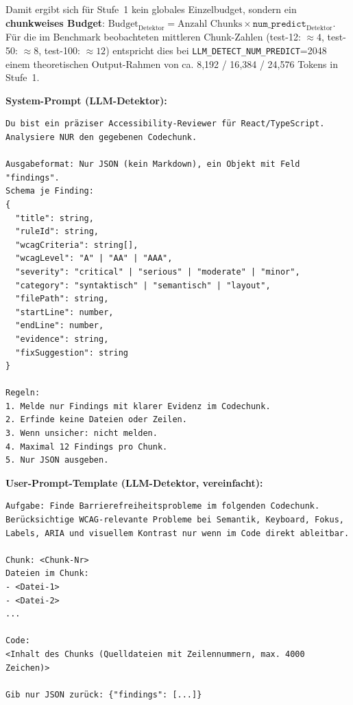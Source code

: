Damit ergibt sich für Stufe~1 kein globales Einzelbudget, sondern ein \textbf{chunkweises Budget}: \(\text{Budget}_{\text{Detektor}} = \text{Anzahl Chunks} \times \texttt{num\_predict}_{\text{Detektor}}\). Für die im Benchmark beobachteten mittleren Chunk-Zahlen (test-12: \(\approx 4\), test-50: \(\approx 8\), test-100: \(\approx 12\)) entspricht dies bei \texttt{LLM\_DETECT\_NUM\_PREDICT}=2048 einem theoretischen Output-Rahmen von ca. 8{,}192 / 16{,}384 / 24{,}576 Tokens in Stufe~1.

\medskip
\noindent\textbf{System-Prompt (\ac{LLM}-Detektor):}


\begin{lstlisting}[language={}, caption={System-Prompt der \ac{LLM}-Detektor-Phase (aus \texttt{src/modules/llmDetector.ts})}, label={lst:detektorsystemprompt}, basicstyle=\ttfamily\scriptsize, breaklines=true]
Du bist ein präziser Accessibility-Reviewer für React/TypeScript.
Analysiere NUR den gegebenen Codechunk.

Ausgabeformat: Nur JSON (kein Markdown), ein Objekt mit Feld "findings".
Schema je Finding:
{
  "title": string,
  "ruleId": string,
  "wcagCriteria": string[],
  "wcagLevel": "A" | "AA" | "AAA",
  "severity": "critical" | "serious" | "moderate" | "minor",
  "category": "syntaktisch" | "semantisch" | "layout",
  "filePath": string,
  "startLine": number,
  "endLine": number,
  "evidence": string,
  "fixSuggestion": string
}

Regeln:
1. Melde nur Findings mit klarer Evidenz im Codechunk.
2. Erfinde keine Dateien oder Zeilen.
3. Wenn unsicher: nicht melden.
4. Maximal 12 Findings pro Chunk.
5. Nur JSON ausgeben.
\end{lstlisting}

\clearpage
\noindent\textbf{User-Prompt-Template (\ac{LLM}-Detektor, vereinfacht):}


\begin{lstlisting}[language={}, caption={User-Prompt-Template der \ac{LLM}-Detektor-Phase; \texttt{<Chunk-Nr>}, \texttt{<Dateiliste>} und \texttt{<Code>} werden zur Laufzeit eingesetzt (aus \texttt{src/modules/llmDetector.ts})}, label={lst:detektoruserprompt}, basicstyle=\ttfamily\scriptsize, breaklines=true]
Aufgabe: Finde Barrierefreiheitsprobleme im folgenden Codechunk.
Berücksichtige WCAG-relevante Probleme bei Semantik, Keyboard, Fokus,
Labels, ARIA und visuellem Kontrast nur wenn im Code direkt ableitbar.

Chunk: <Chunk-Nr>
Dateien im Chunk:
- <Datei-1>
- <Datei-2>
...

Code:
<Inhalt des Chunks (Quelldateien mit Zeilennummern, max. 4000 Zeichen)>

Gib nur JSON zurück: {"findings": [...]}
\end{lstlisting}


